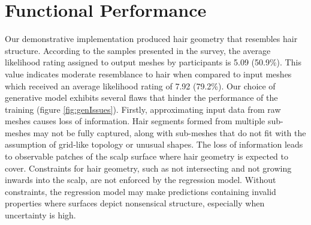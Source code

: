 \documentclass[ %
author={Dillon Keith Diep},
supervisor={Dr. Carl Henrik Ek},
degree={MEng},
title={ART-CG Hair:},
subtitle={Assisted Real-time Content Generation of Stylised Virtual Hair},
type={Research},
year={2017} ]{dissertation}
\begin{document}
\section{Functional Performance}
\label{evaluation:functional}
Our demonstrative implementation produced hair geometry that resembles hair structure. According to the samples presented in the survey, the average likelihood rating assigned to output meshes by participants is 5.09 (50.9\%). This value indicates moderate resemblance to hair when compared to input meshes which received an average likelihood rating of 7.92 (79.2\%). Our choice of generative model exhibits several flaws that hinder the performance of the training (figure \ref{fig:genIssues}). Firstly, approximating input data from raw meshes causes loss of information. Hair segments formed from multiple sub-meshes may not be fully captured, along with sub-meshes that do not fit with the assumption of grid-like topology or unusual shapes. The loss of information leads to observable patches of the scalp surface where hair geometry is expected to cover. Constraints for hair geometry, such as not intersecting and not growing inwards into the scalp, are not enforced by the regression model. Without constraints, the regression model may make predictions containing invalid properties where surfaces depict nonsensical structure, especially when uncertainty is high.
\end{document}
